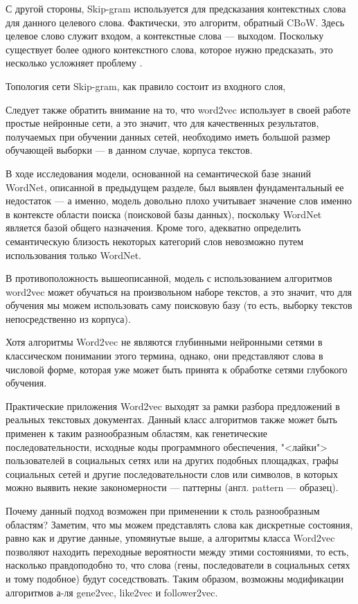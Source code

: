 С другой стороны, Skip-gram используется для предсказания контекстных слова для данного целевого слова. Фактически, это алгоритм, обратный CBoW.
Здесь целевое слово служит входом, а контекстные слова --- выходом. Поскольку существует более одного контекстного слова, которое нужно
предсказать, это несколько усложняет проблему \cite{tds2019skipgram}.

Топология сети Skip-gram, как правило состоит из входного слоя,

Следует также обратить внимание на то, что word2vec использует в своей работе простые нейронные сети, а это значит,
что для качественных результатов, получаемых при обучении данных сетей, необходимо иметь большой размер обучающей выборки ---
в данном случае, корпуса текстов.

В ходе исследования модели, основанной на семантической базе знаний WordNet, описанной в предыдущем разделе, был выявлен
фундаментальный ее недостаток --- а именно, модель довольно плохо учитывает значение слов именно в контексте области поиска
(поисковой базы данных), поскольку WordNet является базой общего назначения. Кроме того, адекватно определить семантическую
близость некоторых категорий слов невозможно путем использования только WordNet.

В противоположность вышеописанной, модель с использованием алгоритмов word2vec может обучаться на произвольном наборе текстов,
а это значит, что для обучения мы можем использовать саму поисковую базу (то есть, выборку текстов непосредственно из корпуса).

Хотя алгоритмы Word2vec не являются глубинными нейронными сетями в классическом понимании этого термина, однако, они представляют
слова в числовой форме, которая уже может быть принята к обработке сетями глубокого обучения.

Практические приложения Word2vec выходят за рамки разбора предложений в реальных текстовых документах. Данный класс алгоритмов
также может быть применен к таким разнообразным областям, как генетические последовательности, исходные коды программного обеспечения,
"<лайки"> пользователей в социальных сетях или на других подобных площадках, графы социальных сетей и другие последовательности
слов или символов, в которых можно выявить некие закономерности --- паттерны (англ. pattern --- образец).

Почему данный подход возможен при применении к столь разнообразным областям? Заметим, что мы можем представлять слова как
дискретные состояния, равно как и другие данные, упомянутые выше, а алгоритмы класса Word2vec позволяют находить переходные вероятности
между этими состояниями, то есть, насколько правдоподобно то, что слова (гены, последователи в социальных сетях и тому подобное)
будут соседствовать. Таким образом, возможны модификации алгоритмов а-ля gene2vec, like2vec и follower2vec.

